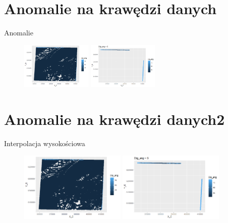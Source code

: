 \documentclass{beamer}
\begin{document}
\section{Anomalie na krawędzi danych}
\begin{frame}{Anomalie}
	\begin{figure}
		\includegraphics[width=0.3\textwidth]{przed_obrobka.png}
		\includegraphics[width=0.3\textwidth]{anomalia.png}
	\end{figure}
\end{frame}

\section{Anomalie na krawędzi danych2}
\begin{frame}{Interpolacja wysokościowa}
	\begin{figure}
		\includegraphics[width=0.45\textwidth]{przed_obrobka.png}
		\includegraphics[width=0.45\textwidth]{anomalia.png}
	\end{figure}
\end{frame}
\end{document}
